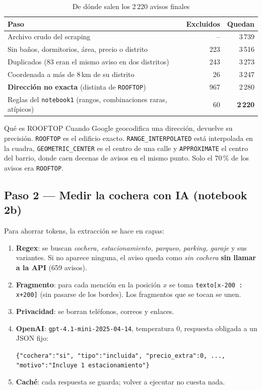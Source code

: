 \documentclass[11pt,a4paper]{article}
\begin{document}
\begin{table}[H]\small
\caption{De dónde salen los 2\,220 avisos finales}
\begin{tabularx}{\textwidth}{Lrr}
\toprule
Paso & Excluidos & Quedan \\
\midrule
Archivo crudo del scraping & -- & 3\,739 \\
Sin baños, dormitorios, área, precio o distrito & 223 & 3\,516 \\
Duplicados (83 eran el mismo aviso en dos distritos) & 243 & 3\,273 \\
Coordenada a más de 8\,km de su distrito & 26 & 3\,247 \\
\textbf{Dirección no exacta} (distinta de \texttt{ROOFTOP}) & 967 & 2\,280 \\
Reglas del \texttt{notebook1} (rangos, combinaciones raras, atípicos) & 60 & \textbf{2\,220} \\
\bottomrule
\end{tabularx}
\end{table}

\begin{idea}{Qué es ROOFTOP}
Cuando Google geocodifica una dirección, devuelve su precisión. \texttt{ROOFTOP} es el edificio exacto. \texttt{RANGE\_INTERPOLATED} está interpolada en la cuadra, \texttt{GEOMETRIC\_CENTER} es el centro de una calle y \texttt{APPROXIMATE} el centro del barrio, donde caen decenas de avisos en el mismo punto. Solo el 70\,\% de los avisos era \texttt{ROOFTOP}.
\end{idea}

\subsection{Paso 2 --- Medir la cochera con IA (notebook 2b)}

Para ahorrar tokens, la extracción se hace en capas:
\begin{enumerate}
\item \textbf{Regex}: se buscan \emph{cochera, estacionamiento, parqueo, parking, garaje} y sus variantes. Si no aparece ninguna, el aviso queda como \emph{sin cochera} \textbf{sin llamar a la API} (659 avisos).
\item \textbf{Fragmento}: para cada mención en la posición $x$ se toma \texttt{texto[x-200 : x+200]} (sin pasarse de los bordes). Los fragmentos que se tocan se unen.
\item \textbf{Privacidad}: se borran teléfonos, correos y enlaces.
\item \textbf{OpenAI}: \texttt{gpt-4.1-mini-2025-04-14}, temperatura 0, respuesta obligada a un JSON fijo:
\begin{center}\small\texttt{\{"cochera":"si", "tipo":"incluida", "precio\_extra":0, ..., "motivo":"Incluye 1 estacionamiento"\}}\end{center}
\item \textbf{Caché}: cada respuesta se guarda; volver a ejecutar no cuesta nada.
\end{enumerate}
\end{document}
